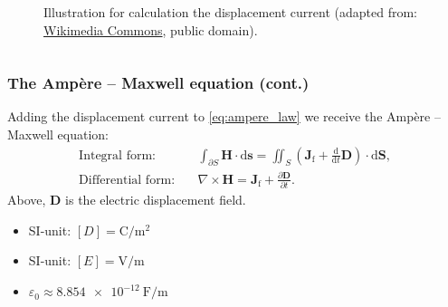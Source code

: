 \begin{frame}
\begin{columns}
\begin{column}{0.4\textwidth}
\begin{figure}
				\caption{Illustration for calculation the displacement current (adapted from: \href{https://commons.wikimedia.org/wiki/File:Maxwell_integral_displacement_current.svg}{Wikimedia Commons}, public domain).}
			\end{figure}
		\end{column}
		\end{columns}
\end{frame}

\begin{frame}
	\frametitle{The Amp\`ere -- Maxwell equation (cont.)}
        Adding the displacement current to \eqref{eq:ampere_law} we receive the Amp\`ere -- Maxwell equation:
            \begin{align}    
            \mbox{Integral form:} \quad  &\int_{\partial S} \bm{H} \cdot \mathrm{d}\bm{s} = \iint_{S}\left(\bm{J}_\mathrm{f} + \frac{\mathrm{d}}{\mathrm{d} t} \bm{D} \right)\cdot\mathrm{d}\bm{S}, \\
            \mbox{Differential form:} \quad &\nabla \times \bm{H} = \bm{J}_\mathrm{f} +  \frac{\partial\bm{D}}{\partial t}. 
            \label{eq:ampere_maxwell_law}
        \end{align}
        Above, $\bm{D}$ is the electric displacement field.
        \vspace{0.5cm}
        \begin{itemize}
            \item SI-unit: $[D] = \si{\coulomb\per\metre\squared}$
            \item SI-unit: $[E] = \si{\volt\per\metre}$
            \item $\varepsilon_0 \approx \SI{8.854e-12}{\farad\per\metre}$
        \end{itemize}
\end{frame}

